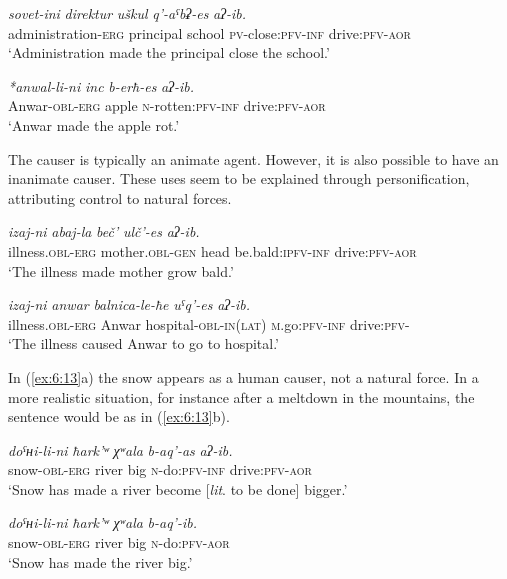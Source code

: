 ﻿\documentclass[output=paper]{langsci/langscibook}
\begin{document}
\ex %
\gll \emph{sovet-ini} \emph{direktur} \emph{uškul} \emph{q'-aˤbʡ-es} \emph{aʔ-ib.}\\
 administration-\textsc{erg} principal school \textsc{pv}-close:\textsc{pfv}-\textsc{inf} drive:\textsc{pfv}-\textsc{aor}\\
\glt `Administration made the principal close the school.'

\ex \label{ex:6:10} %
\gll \emph{*anwal-li-ni} \emph{inc} \emph{b-erħ-es} \emph{aʔ-ib.}\\
Anwar-\textsc{obl}-\textsc{erg} apple \textsc{n}-rotten:\textsc{pfv}-\textsc{inf} drive:\textsc{pfv}-\textsc{aor}\\
\glt `Anwar made the apple rot.'
\z

The causer is typically an animate agent. However, it is
also possible to have an inanimate causer. These uses seem to be explained through
personification, attributing control to natural forces.

\ea \label{ex:6:11} %
\gll \emph{izaj-ni} \emph{abaj-la} \emph{beč'} \emph{ulč'-es} \emph{aʔ-ib.}\\
illness.\textsc{obl}-\textsc{erg} mother.\textsc{obl}-\textsc{gen} head be.bald:\textsc{ipfv}-\textsc{inf} drive:\textsc{pfv}-\textsc{aor}\\
\glt 
`The illness made mother grow bald.'

\ex %
\gll \emph{izaj-ni} \emph{anwar} \emph{balnica-le-ħe} \emph{uˤq'-es} \emph{aʔ-ib.}\\
illness.\textsc{obl}-\textsc{erg} Anwar hospital-\textsc{obl}-\textsc{in}(\textsc{lat}) \textsc{m}.go:\textsc{pfv}-\textsc{inf} drive:\textsc{pfv}-\\
\glt `The illness caused Anwar to go to hospital.'
\z

In (\ref{ex:6:13}a) the snow appears as a human causer, not a natural force. In a
more realistic situation, for instance after a meltdown in the
mountains, the sentence would be as in (\ref{ex:6:13}b).

\ea \label{ex:6:13} %
\ea %
\gll \emph{doˤʜi-li-ni} \emph{ħark'ʷ} \emph{χʷala} \emph{b-aq'-as} \emph{aʔ-ib.}\\
snow-\textsc{obl}-\textsc{erg} river big \textsc{n}-do:\textsc{pfv}-\textsc{inf} drive:\textsc{pfv}-\textsc{aor}\\
\glt `Snow has made a river become [\emph{lit}. to be done] bigger.'

\ex %
\gll \emph{doˤʜi-li-ni} \emph{ħark'ʷ} \emph{χʷala} \emph{b-aq'-ib.}\\
snow-\textsc{obl}-\textsc{erg} river big  \textsc{n}-do:\textsc{pfv}-\textsc{aor}\\
\glt `Snow has made the river big.'
\z
\z
\end{document}
